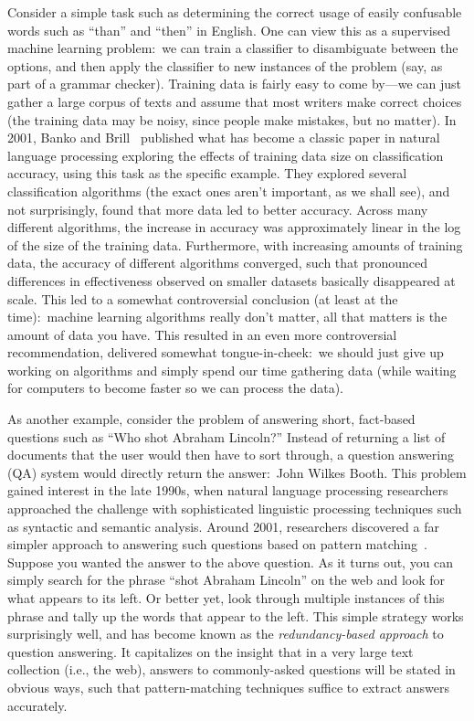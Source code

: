 Consider a simple task such as determining the correct usage of easily
confusable words such as ``than'' and ``then'' in English.  One can
view this as a supervised machine learning problem:\ we can train a
classifier to disambiguate between the options, and then apply the
classifier to new instances of the problem (say, as part of a grammar
checker).  Training data is fairly easy to come by---we can just
gather a large corpus of texts and assume that most writers make
correct choices (the training data may be noisy, since people make
mistakes, but no matter).  In 2001, Banko and Brill~\cite{Banko01}
published what has become a classic paper in natural language
processing exploring the effects of training data size on
classification accuracy, using this task as the specific example.
They explored several classification algorithms (the exact ones aren't
important, as we shall see), and not surprisingly, found that more
data led to better accuracy.  Across many different algorithms, the
increase in accuracy was approximately linear in the log of the size
of the training data.  Furthermore, with increasing amounts of
training data, the accuracy of different algorithms converged, such
that pronounced differences in effectiveness observed on smaller
datasets basically disappeared at scale.  This led to a somewhat
controversial conclusion (at least at the time):\ machine learning
algorithms really don't matter, all that matters is the amount of data
you have.  This resulted in an even more controversial recommendation,
delivered somewhat tongue-in-cheek:\ we should just give up working on
algorithms and simply spend our time gathering data (while waiting for
computers to become faster so we can process the data).

As another example, consider the problem of answering short,
fact-based questions such as ``Who shot Abraham Lincoln?''  Instead of
returning a list of documents that the user would then have to sort
through, a question answering (QA) system would directly return the
answer:\ John Wilkes Booth.  This problem gained interest in the late
1990s, when natural language processing researchers approached the
challenge with sophisticated linguistic processing techniques such as
syntactic and semantic analysis.  Around 2001, researchers discovered
a far simpler approach to answering such questions based on pattern
matching~\cite{Brill_etal_TREC2001,Dumais_etal_SIGIR2002,Lin_TOIS2007}.
Suppose you wanted the answer to the above question.  As it turns out,
you can simply search for the phrase ``shot Abraham Lincoln'' on the
web and look for what appears to its left.  Or better yet, look
through multiple instances of this phrase and tally up the words that
appear to the left.  This simple strategy works surprisingly well, and
has become known as the {\it redundancy-based approach} to question
answering.  It capitalizes on the insight that in a very large text
collection (i.e., the web), answers to commonly-asked questions will
be stated in obvious ways, such that pattern-matching techniques
suffice to extract answers accurately.

